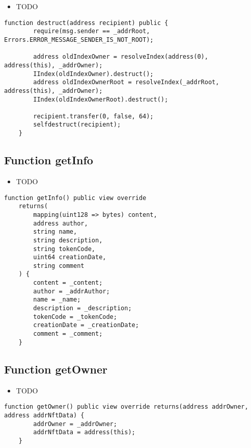 \begin{itemize}
\item TODO
\end{itemize}

\begin{lstlisting}[firstnumber=77]
    function destruct(address recipient) public {
        require(msg.sender == _addrRoot, Errors.ERROR_MESSAGE_SENDER_IS_NOT_ROOT);

        address oldIndexOwner = resolveIndex(address(0), address(this), _addrOwner);
        IIndex(oldIndexOwner).destruct();
        address oldIndexOwnerRoot = resolveIndex(_addrRoot, address(this), _addrOwner);
        IIndex(oldIndexOwnerRoot).destruct();

        recipient.transfer(0, false, 64);
        selfdestruct(recipient);
    }
\end{lstlisting}

\subsection{Function getInfo}

\begin{itemize}
\item TODO
\end{itemize}

\begin{lstlisting}[firstnumber=94]
    function getInfo() public view override
    returns(
        mapping(uint128 => bytes) content,
        address author,
        string name,
        string description,
        string tokenCode,
        uint64 creationDate,
        string comment
    ) {
        content = _content;
        author = _addrAuthor;
        name = _name;
        description = _description;
        tokenCode = _tokenCode;
        creationDate = _creationDate;
        comment = _comment;
    }
\end{lstlisting}

\subsection{Function getOwner}

\begin{itemize}
\item TODO
\end{itemize}

\begin{lstlisting}[firstnumber=89]
    function getOwner() public view override returns(address addrOwner, address addrNftData) {
        addrOwner = _addrOwner;
        addrNftData = address(this);
    }
\end{lstlisting}

